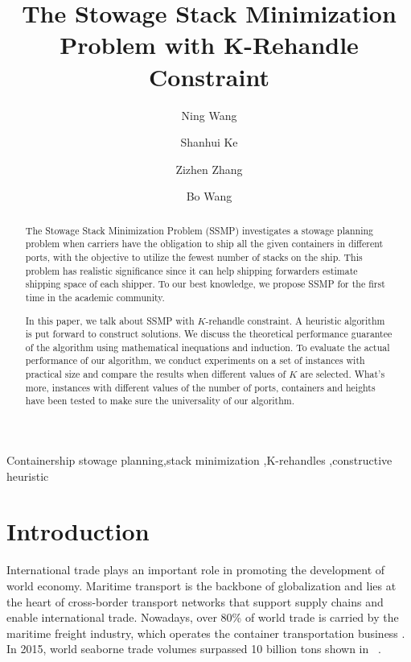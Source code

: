 \documentclass[review,3p,times,authoryear,12pt]{elsarticle}
\begin{document}
\begin{frontmatter}
\newpage

\title{The Stowage Stack Minimization Problem with K-Rehandle Constraint}
\author[shu]{Ning Wang}

\author[shu]{Shanhui Ke}

\author[syu]{Zizhen Zhang}

\author[set]{Bo Wang}


\address[shu]{
Department of Information Management, School of Management, Shanghai University, Shanghai, China
}
\address[syu]{
School of Data and Computer Science, Sun Yat-Sen University, China
}
\address[set]{
College of Urban Rail Transportation, Shanghai University of Engineering Science
}

\begin{abstract}
The Stowage Stack Minimization Problem (SSMP) investigates a stowage planning problem when carriers have the obligation to ship all the given containers in different ports, with the objective to utilize the fewest number of stacks on the ship. This problem has realistic significance since it can help shipping forwarders estimate shipping space of each shipper.
To our best knowledge, we propose SSMP for the first time in the academic community.

In this paper, we talk about SSMP with $K$-rehandle constraint. A heuristic algorithm is put forward to construct solutions. We discuss the theoretical performance guarantee of the algorithm using mathematical inequations and induction.
To evaluate the actual performance of our algorithm, we conduct experiments on a set of instances with practical size and compare the results when different values of $K$ are selected.
What's more, instances with different values of the number of ports, containers and heights have been tested to make sure the universality of our algorithm.
\end{abstract}

\begin{keyword}
Containership stowage planning\sep stack minimization \sep K-rehandles \sep constructive heuristic
\end{keyword}
\end{frontmatter}


\section{Introduction}
\label{sec:i}
International trade plays an important role in promoting the development of world economy.
Maritime transport is the backbone of globalization and lies at the heart of cross-border transport networks that support supply chains and enable international trade.
Nowadays, over 80\% of world trade is carried by the maritime freight industry, which operates the container transportation business \citep{zhang2016multiobjective}.
In 2015, world seaborne trade volumes surpassed 10 billion tons shown in ~\cite{unctad2016}.
\end{document}
